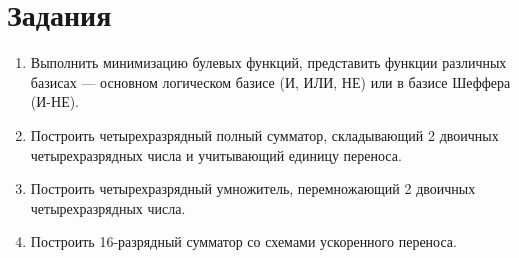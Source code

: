 \documentclass[oneside,a4paper,14pt]{extarticle}
\begin{document}
\section*{Задания}
\begin{enumerate}
	\item
	      Выполнить минимизацию булевых функций, представить функции
	      различных базисах --- основном логическом базисе (И, ИЛИ, НЕ) или в
	      базисе Шеффера (И-НЕ).
	\item
	      Построить четырехразрядный полный сумматор, складывающий 2
	      двоичных четырехразрядных числа и учитывающий единицу переноса.
	\item
	      Построить четырехразрядный умножитель, перемножающий 2 двоичных
	      четырехразрядных числа.
	\item
	      Построить 16-разрядный сумматор со схемами ускоренного переноса.
\end{enumerate}
\newpage
\end{document}
